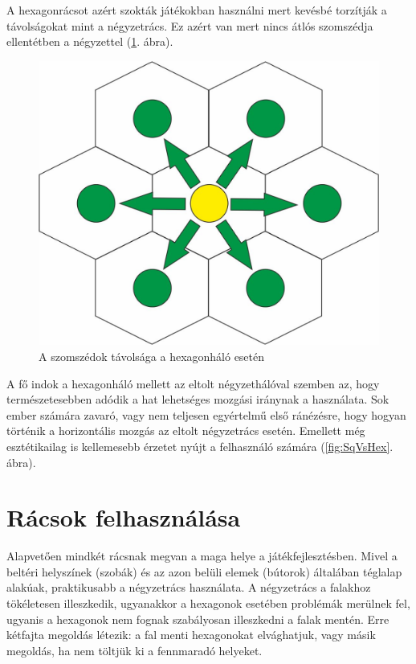 A hexagonrácsot azért szokták játékokban használni mert kevésbé torzítják a távolságokat mint a négyzetrács. Ez azért van mert nincs átlós szomszédja ellentétben a négyzettel (\ref{fig:HexDistance}. ábra).

\begin{figure}[h!]
\centering
\includegraphics[scale=0.4]{kepek/HexDistance.jpg}
\caption{A szomszédok távolsága a hexagonháló esetén}
\label{fig:HexDistance}
\end{figure}

A fő indok a hexagonháló mellett az eltolt négyzethálóval szemben az, hogy természetesebben adódik a hat lehetséges mozgási iránynak a használata. Sok ember számára zavaró, vagy nem teljesen egyértelmű első ránézésre, hogy hogyan történik a horizontális mozgás az eltolt négyzetrács esetén. Emellett még esztétikailag is kellemesebb érzetet nyújt a felhasználó számára (\ref{fig:SqVsHex}. ábra).

\section{Rácsok felhasználása}

Alapvetően mindkét rácsnak megvan a maga helye a játékfejlesztésben.  Mivel a beltéri helyszínek (szobák) és az azon belüli elemek (bútorok) általában téglalap alakúak, praktikusabb a négyzetrács használata. A négyzetrács a falakhoz tökéletesen illeszkedik, ugyanakkor a hexagonok esetében problémák merülnek fel, ugyanis a hexagonok nem fognak szabályosan illeszkedni a falak mentén. Erre kétfajta megoldás létezik: a fal menti hexagonokat elvághatjuk, vagy másik megoldás, ha nem töltjük ki a fennmaradó helyeket.

